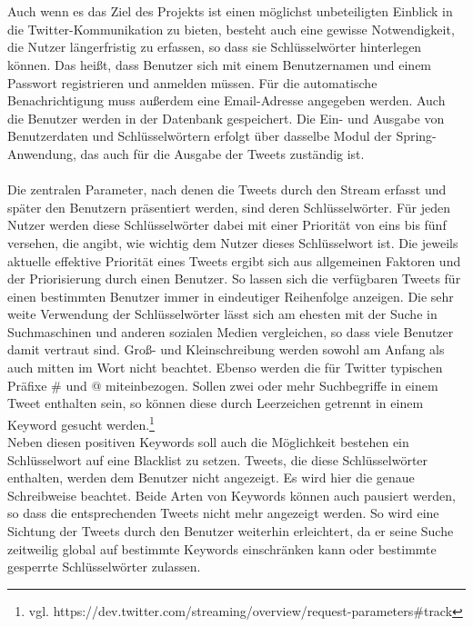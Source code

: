 \\\\ %
Auch wenn es das Ziel des Projekts ist einen möglichst unbeteiligten Einblick in die Twitter-Kommunikation zu bieten, besteht auch eine gewisse Notwendigkeit, die Nutzer längerfristig zu erfassen, so dass sie Schlüsselwörter hinterlegen können. Das heißt, dass Benutzer sich mit einem Benutzernamen und einem Passwort registrieren und anmelden müssen. Für die automatische Benachrichtigung muss außerdem eine Email-Adresse angegeben werden. Auch die Benutzer werden in der Datenbank gespeichert. Die Ein- und Ausgabe von Benutzerdaten und Schlüsselwörtern erfolgt über dasselbe Modul der Spring-Anwendung, das auch für die Ausgabe der Tweets zuständig ist.
\\\\
Die zentralen Parameter, nach denen die Tweets durch den Stream erfasst und später den Benutzern präsentiert werden, sind deren Schlüsselwörter. Für jeden Nutzer werden diese Schlüsselwörter dabei mit einer Priorität von eins bis fünf versehen, die angibt, wie wichtig dem Nutzer dieses Schlüsselwort ist. Die jeweils aktuelle effektive Priorität eines Tweets ergibt sich aus allgemeinen Faktoren und der Priorisierung durch einen Benutzer. So lassen sich die verfügbaren Tweets für einen bestimmten Benutzer immer in eindeutiger Reihenfolge anzeigen. Die sehr weite Verwendung der Schlüsselwörter lässt sich am ehesten mit der Suche in Suchmaschinen und anderen sozialen Medien vergleichen, so dass viele Benutzer damit vertraut sind. Groß- und Kleinschreibung werden sowohl am Anfang als auch mitten im Wort nicht beachtet. Ebenso werden die für Twitter typischen Präfixe \glqq \#\grqq{} und \glqq @\grqq{} miteinbezogen. Sollen zwei oder mehr Suchbegriffe in einem Tweet enthalten sein, so können diese durch Leerzeichen getrennt in einem Keyword gesucht werden.\footnote{vgl. https://dev.twitter.com/streaming/overview/request-parameters\#track} \\
Neben diesen positiven Keywords soll auch die Möglichkeit bestehen ein Schlüsselwort auf eine Blacklist zu setzen. Tweets, die diese Schlüsselwörter enthalten, werden dem Benutzer nicht angezeigt. Es wird hier die genaue Schreibweise beachtet. Beide Arten von Keywords können auch pausiert werden, so dass die entsprechenden Tweets nicht mehr angezeigt werden. So wird eine Sichtung der Tweets durch den Benutzer weiterhin erleichtert, da er seine Suche zeitweilig global auf bestimmte Keywords einschränken kann oder bestimmte gesperrte Schlüsselwörter zulassen. \\
